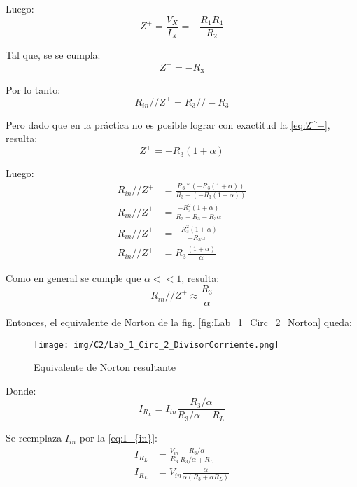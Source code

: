 Luego:
\begin{equation*}
    Z^+=\frac{V_X}{I_X}=-\frac{R_1R_4}{R_2}
\end{equation*}

Tal que, se se cumpla:
\begin{equation}
    Z^+=-R_3
    \label{eq:Z^+}
\end{equation}

Por lo tanto:
\begin{equation*}
    R_{in}//Z^+=R_3//-R_3
\end{equation*}

Pero dado que en la práctica no es posible lograr con exactitud la \autoref{eq:Z^+}, resulta:
\begin{equation*}
    Z^+=-R_3(1+\alpha)
\end{equation*}

Luego:
\begin{align*}
    R_{in}//Z^+ &= \frac{R_3*(-R_3(1+\alpha))}{R_3+(-R_3(1+\alpha))} \\
    R_{in}//Z^+ &= \frac{-R_3^2(1+\alpha)}{R_3-R_3-R_3\alpha} \\
    R_{in}//Z^+ &= \frac{-R_3^2(1+\alpha)}{-R_3\alpha} \\
    R_{in}//Z^+ &= R_3\frac{(1+\alpha)}{\alpha}
\end{align*}

Como en general se cumple que $\alpha<<1$, resulta:
\begin{equation*}
    R_{in}//Z^+ \approx \frac{R_3}{\alpha}
\end{equation*}

Entonces, el equivalente de Norton de la fig. \ref{fig:Lab_1_Circ_2_Norton} queda:
\begin{figure}[H]
    \centering
    \texttt{[image: img/C2/Lab\_1\_Circ\_2\_DivisorCorriente.png]}
    \caption{Equivalente de Norton resultante}
    \label{fig:Lab_1_Circ_2_DivisorCorriente}
\end{figure}

Donde:
\begin{equation*}
    I_{R_L}=I_{in}\frac{R_3/\alpha}{R_3/\alpha+R_L}
\end{equation*}

Se reemplaza $I_{in}$ por la \autoref{eq:I_{in}}:
\begin{align*}    
    I_{R_L} &= \frac{V_{in}}{R_3}\frac{R_3/\alpha}{R_3/\alpha+R_L} \\
    I_{R_L} &= V_{in}\frac{\alpha}{\alpha (R_3+\alpha R_L)}
\end{align*}

